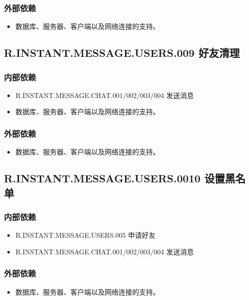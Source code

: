 {    \subsubsection{外部依赖}
    \begin{itemize}
        \item 数据库、服务器、客户端以及网络连接的支持。
    \end{itemize}

    \subsection{R.INSTANT.MESSAGE.USERS.009 好友清理}
    \subsubsection{内部依赖}
    \begin{itemize}
        \item R.INSTANT.MESSAGE.CHAT.001/002/003/004 发送消息
    \end{itemize}
    \begin{itemize}
        \item 数据库、服务器、客户端以及网络连接的支持。
    \end{itemize}
    \subsubsection{外部依赖}
    \begin{itemize}
        \item 数据库、服务器、客户端以及网络连接的支持。
    \end{itemize}

    \subsection{R.INSTANT.MESSAGE.USERS.0010 设置黑名单}
    \subsubsection{内部依赖}
    \begin{itemize}
        \item R.INSTANT.MESSAGE.USERS.005 申请好友
        \item R.INSTANT.MESSAGE.CHAT.001/002/003/004 发送消息
    \end{itemize}
    \subsubsection{外部依赖}
    \begin{itemize}
        \item 数据库、服务器、客户端以及网络连接的支持。
    \end{itemize}

}
